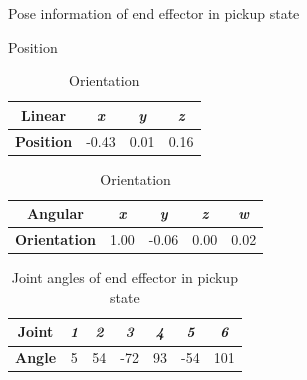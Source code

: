 \documentclass[12pt]{article}
\begin{document}
\begin{enumerate}
\begin{enumerate}
            \begin{table}[H]
                \caption{Pose information of end effector in pickup state}
                \begin{subtable}{.5\linewidth}
                    \centering
                    \caption{Position}
                    \begin{tabular}{cccc}
                        \toprule
                        \textbf{Linear} & \textit{x} & \textit{y} & \textit{z} \\\midrule
                        \textbf{Position} & -0.43 & 0.01 & 0.16 \\\bottomrule
                    \end{tabular}
                \end{subtable}
                \begin{subtable}{.5\linewidth}
                    \centering
                    \caption{Orientation}
                    \begin{tabular}{ccccc}
                        \toprule
                        \textbf{Angular} & \textit{x} & \textit{y} & \textit{z} & \textit{w} \\\midrule
                        \textbf{Orientation} & 1.00 & -0.06 & 0.00 & 0.02 \\\bottomrule
                    \end{tabular}
                \end{subtable}
            \end{table}
            
            \begin{table}[H]
                \centering
                \caption{Joint angles of end effector in pickup state}
                \begin{tabular}{ccccccc}
                \toprule
                \textbf{Joint} & \textit{1} & \textit{2} & \textit{3} & \textit{4} & \textit{5} & \textit{6} \\\midrule
                \textbf{Angle} & 5 & 54 & -72 & 93 & -54 & 101 \\\bottomrule
                \end{tabular}
            \end{table}


\end{enumerate}
\end{enumerate}
\end{document}
